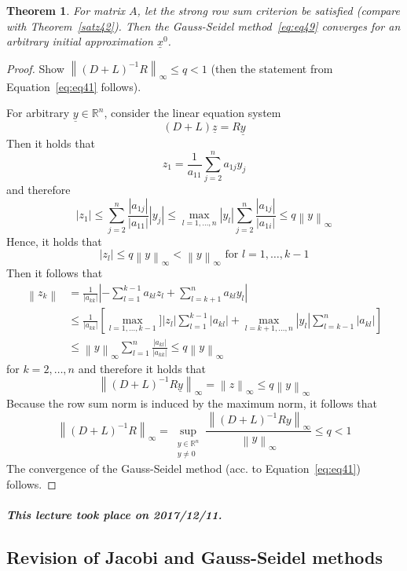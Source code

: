 \documentclass{article}
\newtheorem{theorem}{Theorem}
\newcommand{\card}[1]{\left|#1\right|}
\newcommand{\norm}[1]{\left\|#1\right\|}
\newcommand{\dateref}[1]{\paragraph{\textit{This lecture took place on #1.}}}
\begin{document}
\begin{theorem} %
  \label{satz43}
  For matrix $A$, let the strong row sum criterion be satisfied (compare with Theorem~\ref{satz42}).
  Then the Gauss-Seidel method~\ref{eq:eq49} converges for an arbitrary initial approximation $\underline{x}^0$.
\end{theorem}
\begin{proof}
  Show $\norm{(D+L)^{-1} R}_{\infty} \leq q < 1$ (then the statement from Equation~\ref{eq:eq41} follows).

  For arbitrary $\underline{y} \in \mathbb R^n$, consider the linear equation system
  \[ (D + L) \underline{z} = R \underline{y} \]
  Then it holds that
  \[ z_1 = \frac{1}{a_{11}} \sum_{j=2}^n a_{1j} y_j \]
  and therefore
  \[ \card{z_1} \leq \sum_{j=2}^n \frac{\card{a_{1j}}}{\card{a_{11}}} \card{y_{j}} \leq \max_{l=1,\ldots,n} \card{y_l} \sum_{j=2}^n \frac{\card{a_{1j}}}{\card{a_{1i}}} \leq q \norm{y}_\infty \]
  Hence, it holds that
  \[ \card{z_l} \leq q \norm{y}_{\infty} < \norm{y}_{\infty} \text{ for } l=1,\ldots,k-1 \]
  Then it follows that
  \begin{align*}
    \norm{z_k} &= \frac{1}{\card{a_{kk}}} \card{-\sum_{l=1}^{k-1} a_{kl} z_l + \sum_{l=k+1}^n a_{kl} y_l} \\
      &\leq \frac{1}{\card{a_{kk}}} \left[ \max_{l=1,\ldots,k-1}] \card{z_l} \sum_{l=1}^{k-1} \card{a_{kl}} + \max_{l=k+1,\ldots,n} \card{y_l} \sum_{l=k-1}^n \card{a_{kl}}\right] \\
      &\leq \norm{y}_{\infty} \sum_{l=1}^n \frac{\card{a_{kl}}}{\card{a_{kk}}} \leq q \norm{y}_{\infty}
  \end{align*}
  for $k=2,\ldots,n$ and therefore it holds that
  \[ \norm{(D+L)^{-1} R \underline{y}}_{\infty} = \norm{z}_{\infty} \leq q \norm{y}_{\infty} \]
  Because the row sum norm is induced by the maximum norm, it follows that
  \[ \norm{(D+L)^{-1} R}_{\infty} = \sup_{\substack{y \in \mathbb R^n \\ y \neq 0}} \frac{\norm{(D+L)^{-1} Ry}_{\infty}}{\norm{y}_{\infty}} \leq q < 1 \]
  The convergence of the Gauss-Seidel method (acc. to Equation~\ref{eq:eq41}) follows.
\end{proof}

\dateref{2017/12/11}

\subsection{Revision of Jacobi and Gauss-Seidel methods}
\end{document}
